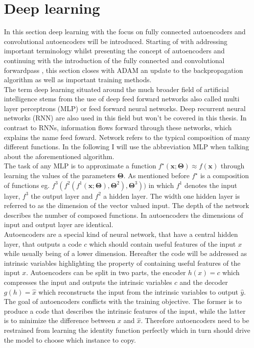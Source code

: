 \documentclass[12pt, a4paper]{article}
\begin{document}
\section{Deep learning}
In this section deep learning with the focus on fully connected autoencoders and convolutional autoencoders will be introduced. Starting of with addressing important terminology whilst presenting the concept of autoencoders and continuing with the introduction of the fully connected and convolutional forwardpass , this section closes with ADAM \cite{the} an update to the backpropagation algorithm as well as important training methods.\\ 
The term deep learning situated around the much broader field of artificial intelligence stems from the use of deep feed forward networks also called multi layer perceptrons (MLP) or feed forward neural networks. Deep recurrent neural networks (RNN) are also used in this field but won't be covered in this thesis. In contrast to RNNs, information flows forward through these networks, which explains the name feed foward. Network refers to the typical composition of many different functions. In the following I will use the abbreviation MLP when talking about the aforementioned algorithm.\\The task of any MLP is to approximate a function \(f^\star(\mathbf{x};\mathbf{\Theta}) \approx f(\mathbf{x})\) through learning the values of the parameters \(\mathbf{\Theta}\). As mentioned before  \(f^\star\) is a composition of functions eg. \(f^3(f^2(f^1(\mathbf{x};\mathbf{\Theta}),\mathbf{\Theta}^2),\mathbf{\Theta}^3))\) in which \(f^1\) denotes the input layer, \(f^3\) the output layer and \(f^2\) a hidden layer. The width one hidden layer is referred to as the dimension of the vector valued input. The depth of the network describes the number of composed functions. In autoencoders the dimensions of input and output layer are identical.\\Autoencoders are a special kind of neural network, that have a central hidden layer, that outputs a code \(c\) which should contain useful features of the input \(x\) while usually being of a lower dimension. Hereafter the code will be addressed as intrinsic variables highlighting the property of containing useful features of the input \(x\). Autoencoders can be split in two parts, the encoder \(h(x) = c\) which compresses the input and outputs the intrinsic variables \(c\) and the decoder \(g(h) = \hat{x}\) which reconstructs the input from the intrinsic variables to output \(\hat{y}\). The goal of autoencoders conflicts with the training objective. The former is to produce a code that describes the intrinsic features of the input, while the latter is to minimize the difference between \(x\) and \(\hat{x}\). Therefore autoencoders need to be restrained from learning the identity function perfectly which in turn should drive the model to choose which instance to copy.
\end{document}
